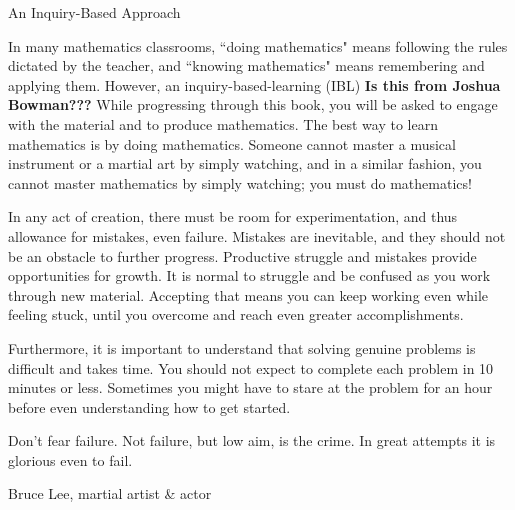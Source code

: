 \begin{section}{An Inquiry-Based Approach}

In many mathematics classrooms, ``doing mathematics" means following the rules dictated by the teacher, and ``knowing mathematics" means remembering and applying them. However, an inquiry-based-learning (IBL) 
\textbf{Is this from Joshua Bowman???}
While progressing through this book, you will be asked to engage with the material and to produce mathematics. The best way to learn mathematics is by doing mathematics.  Someone cannot master a musical instrument or a martial art by simply watching, and in a similar fashion, you cannot master mathematics by simply watching; you must do mathematics!

In any act of creation, there must be room for experimentation, and thus allowance for mistakes, even failure. Mistakes are inevitable, and they should not be an obstacle to further progress. Productive struggle and mistakes provide opportunities for growth.  It is normal to struggle and be confused as you work through new material. Accepting that means you can keep working even while feeling stuck, until you overcome and reach even greater accomplishments.

Furthermore, it is important to understand that solving genuine problems is difficult and takes time.  You should not expect to complete each problem in 10 minutes or less.  Sometimes you might have to stare at the problem for an hour before even understanding how to get started.



\epigraph{Don't fear failure.  Not failure, but low aim, is the crime. In great attempts it is glorious even to fail.}{Bruce Lee, martial artist \& actor}

\end{section}

